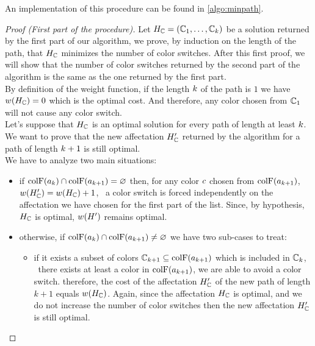 An implementation of this procedure can be found in \cref{algo:minpath}.


\begin{proof}[Proof (First part of the procedure)]
  Let $H_{\mathbb{C}} = (\mathbb{C}_1,\ldots,\mathbb{C}_{k})$ be a solution returned by the first part of our algorithm, we prove, by induction on the length of the path, that $H_{\mathbb{C}}$ minimizes the number of color switches. After this first proof, we will show that the number of color switches returned by the second part of the algorithm is the same as the one returned by the first part. \\
  By definition of the weight function, if the length $k$ of the path is $1$ we have $w(H_{\mathbb{C}}) = 0$ which is the optimal cost. And therefore, any color chosen from $\mathbb{C}_1$ will not cause any color switch.\\
  Let's suppose that $H_{\mathbb{C}}$ is an optimal solution for every path of length at least $k$. We want to prove that the new affectation $H_{\mathbb{C}}'$ returned by the algorithm for a path of length $k+1$ is still optimal. \\
  We have to analyze two main situations:

  \begin{itemize}
    \item if $\text{colF}(a_k) \cap \text{colF}(a_{k+1}) = \varnothing$ then, for any color $c$ chosen from $\text{colF}(a_{k+1})$, $w(H_{\mathbb{C}}') = w(H_{\mathbb{C}}) + 1$, \ie\ a color switch is forced independently on the affectation we have chosen for the first part of the list. Since, by hypothesis, $H_{\mathbb{C}}$ is optimal, $w(H')$ remains optimal.
    \item otherwise, if $\text{colF}(a_k) \cap \text{colF}(a_{k+1}) \neq \varnothing$ we have two sub-cases to treat:
          \begin{itemize}

            \item if it exists a subset of colors $\mathbb{C}_{k+1} \subseteq \text{colF}(a_{k+1})$ which is included in $\mathbb{C}_k$, \ie\ there exists at least a color in $\text{colF}(a_{k+1})$, we are able to avoid a color switch. therefore, the cost of the affectation $H_{\mathbb{C}}'$ of the new path of length $k+1$ equals $w(H_{\mathbb{C}})$. Again, since the affectation $H_{\mathbb{C}}$ is optimal, and we do not increase the number of color switches then the new affectation $H_{\mathbb{C}}'$ is still optimal.


\end{itemize}
\end{itemize}
\end{proof}
